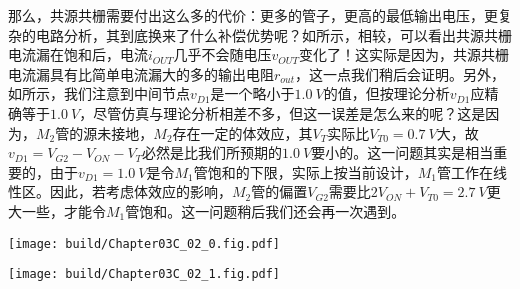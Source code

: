 那么，共源共栅需要付出这么多的代价：更多的管子，更高的最低输出电压，更复杂的电路分析，其到底换来了什么补偿优势呢？如所示，相较，可以看出共源共栅电流漏在饱和后，电流$i_{OUT}$几乎不会随电压$v_{OUT}$变化了！这实际是因为，共源共栅电流漏具有比简单电流漏大的多的输出电阻$r_{out}$，这一点我们稍后会证明。另外，如所示，我们注意到中间节点$v_{D1}$是一个略小于$\SI{1.0}{V}$的值，但按理论分析$v_{D1}$应精确等于$\SI{1.0}{V}$，尽管仿真与理论分析相差不多，但这一误差是怎么来的呢？这是因为，$M_2$管的源未接地，$M_2$存在一定的体效应，其$V_T$实际比$V_{T0}=\SI{0.7}{V}$大，故$v_{D1}=V_{G2}-V_{ON}-V_T$必然是比我们所预期的$\SI{1.0}{V}$要小的。这一问题其实是相当重要的，由于$v_{D1}=\SI{1.0}{V}$是令$M_1$管饱和的下限，实际上按当前设计，$M_1$管工作在线性区。因此，若考虑体效应的影响，$M_2$管的偏置$V_{G2}$需要比$2V_{ON}+V_{T0}=\SI{2.7}{V}$更大一些，才能令$M_1$管饱和。这一问题稍后我们还会再一次遇到。
\begin{Figure}[MOS电流漏的大信号特性]
    \begin{FigureSub}
        \texttt{[image: build/Chapter03C\_02\_0.fig.pdf]}
    \end{FigureSub}
    \begin{FigureSub}
        \texttt{[image: build/Chapter03C\_02\_1.fig.pdf]}
    \end{FigureSub}
\end{Figure}\goodbreak

